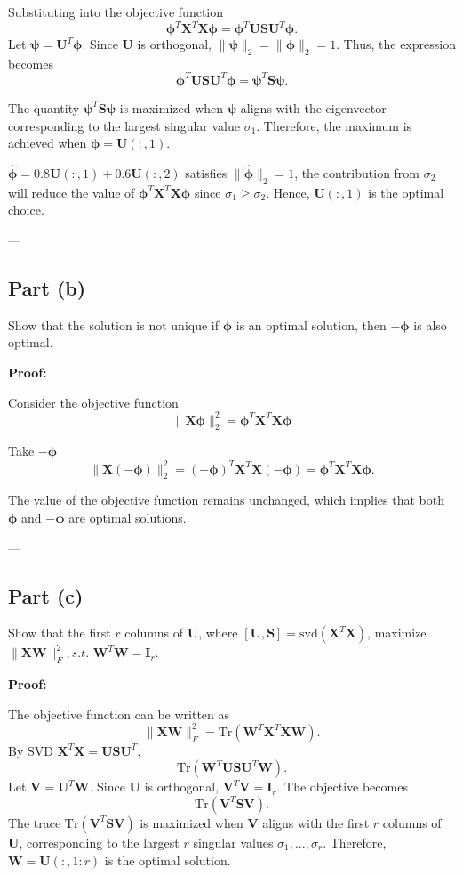 \documentclass[11pt]{article}
\newcommand{\mtx}[1]{\mathbf{#1}}
\def \mI {\mtx{I}}
\def \mU {\mtx{U}}
\def \mS {\mtx{S}}
\def \mV {\mtx{V}}
\def \mW {\mtx{W}}
\def \mX {\mtx{X}}
\begin{document}
Substituting into the objective function
   \[
   \bm{\phi}^T \mX^T \mX \bm{\phi} = \bm{\phi}^T \mU \mS \mU^T \bm{\phi}.
   \]
   Let $\bm{\psi} = \mU^T \bm{\phi}$. Since $\mU$ is orthogonal, $\|\bm{\psi}\|_2 = \|\bm{\phi}\|_2 = 1$. Thus, the expression becomes
   \[
   \bm{\phi}^T \mU \mS \mU^T \bm{\phi} = \bm{\psi}^T \mS \bm{\psi}.
   \]

The quantity $\bm{\psi}^T \mS \bm{\psi}$ is maximized when $\bm{\psi}$ aligns with the eigenvector corresponding to the largest singular value $\sigma_1$. Therefore, the maximum is achieved when $\bm{\phi} = \mU(:, 1)$.

$\hat{\bm{\phi}} = 0.8 \mU(:, 1) + 0.6 \mU(:, 2)$ satisfies $\|\hat{\bm{\phi}}\|_2 = 1$, the contribution from $\sigma_2$ will reduce the value of $\bm{\phi}^T \mX^T \mX \bm{\phi}$ since $\sigma_1 \geq \sigma_2$. Hence, $\mU(:, 1)$ is the optimal choice.

---

\subsection*{Part (b)}
Show that the solution is not unique if $\bm{\phi}$ is an optimal solution, then $-\bm{\phi}$ is also optimal.

\textbf{Proof:}

Consider the objective function 
	\[
	\|\mX \bm{\phi}\|_2^2 = \bm{\phi}^T \mX^T \mX \bm{\phi}
	\]

Take $-\bm{\phi}$
   \[
   \|\mX (-\bm{\phi})\|_2^2 = (-\bm{\phi})^T \mX^T \mX (-\bm{\phi}) = \bm{\phi}^T \mX^T \mX \bm{\phi}.
   \]

The value of the objective function remains unchanged, which implies that both $\bm{\phi}$ and $-\bm{\phi}$ are optimal solutions.

---

\subsection*{Part (c)}
Show that the first $r$ columns of $\mU$, where $[\mU, \mS] = \text{svd}(\mX^T \mX)$, maximize $\|\mX \bm{\mW}\|_F^2, s.t.$ $\bm{\mW}^T \bm{\mW} = \mI_r$.

\textbf{Proof:}

The objective function can be written as
   \[
   \|\mX \bm{\mW}\|_F^2 = \text{Tr}(\bm{\mW}^T \mX^T \mX \bm{\mW}).
   \]
By SVD $\mX^T \mX = \mU \mS \mU^T$,
   \[
   \text{Tr}(\bm{\mW}^T \mU \mS \mU^T \bm{\mW}).
   \]
Let $\bm{\mV} = \mU^T \bm{\mW}$. Since $\mU$ is orthogonal, $\bm{\mV}^T \bm{\mV} = \mI_r$. The objective becomes
   \[
   \text{Tr}(\bm{\mV}^T \mS \bm{\mV}).
   \]
The trace $\text{Tr}(\bm{\mV}^T \mS \bm{\mV})$ is maximized when $\bm{\mV}$ aligns with the first $r$ columns of $\mU$, corresponding to the largest $r$ singular values $\sigma_1, \dots, \sigma_r$. Therefore, $\bm{\mW} = \mU(:, 1:r)$ is the optimal solution.
\end{document}
